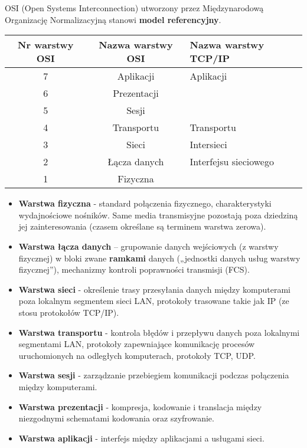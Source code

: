 \documentclass[../main.tex]{subfiles}
\begin{document}
    OSI (Open Systems Interconnection) utworzony przez Międzynarodową Organizację
    Normalizacyjną stanowi \textbf{model referencyjny}.


    \begin{tabularx}{\textwidth}{ |c|c| >{\centering\arraybackslash}X | }
        \hline
        Nr warstwy OSI & Nazwa warstwy OSI & Nazwa warstwy TCP/IP\\
        \hline
        7 & Aplikacji & Aplikacji\\
        6 & Prezentacji &\\
        5 & Sesji & \\
        \hline
        4 & Transportu & Transportu \\
        \hline
        3 & Sieci & Intersieci \\
        \hline
        2 & Łącza danych & Interfejsu sieciowego\\

        1 & Fizyczna & \\
        \hline
    \end{tabularx}

    \begin{itemize}
        \item \textbf{Warstwa fizyczna} - standard połączenia fizycznego, charakterystyki wydajnościowe nośników. Same media transmisyjne pozostają poza dziedziną jej
        zainteresowania (czasem określane są terminem warstwa zerowa).
        \item \textbf{Warstwa łącza danych} – grupowanie danych wejściowych (z warstwy fizycznej) w bloki zwane \textbf{ramkami} danych („jednostki
        danych usług warstwy fizycznej”), mechanizmy kontroli poprawności
        transmisji (FCS).
        \item \textbf{Warstwa sieci} - określenie trasy przesyłania
        danych między komputerami poza lokalnym segmentem sieci LAN, protokoły trasowane takie jak IP (ze stosu protokołów TCP/IP).
        \item \textbf{Warstwa transportu} - kontrola błędów i przepływu danych
        poza lokalnymi segmentami LAN, protokoły zapewniające
        komunikację procesów uruchomionych na odległych komputerach, protokoły TCP, UDP.
        \item \textbf{Warstwa sesji} - zarządzanie przebiegiem komunikacji podczas
        połączenia między komputerami.
        \item \textbf{Warstwa prezentacji} - kompresja, kodowanie i
        translacja między niezgodnymi schematami kodowania oraz szyfrowanie.
        \item \textbf{Warstwa aplikacji} - interfejs między aplikacjami a
        usługami sieci.
    \end{itemize}
\end{document}
